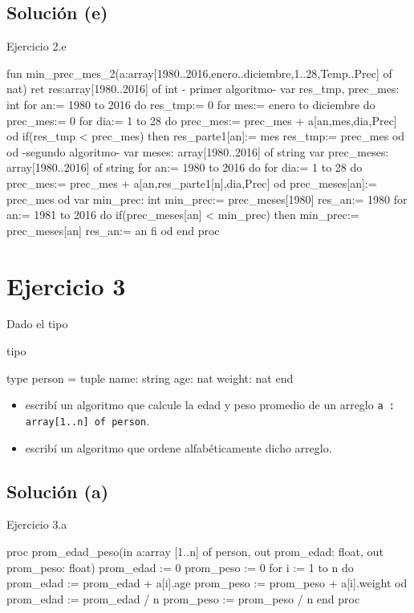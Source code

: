 \subsection{Solución (e)}
\begin{codebox}{Ejercicio 2.e}
\begin{pascallike}
fun min_prec_mes_2(a:array[1980..2016,enero..diciembre,1..28,Temp..Prec] of nat) 
    ret res:array[1980..2016] of int
{- primer algoritmo-}
var res_tmp, prec_mes: int
for an:= 1980 to 2016 do
    res_tmp:= 0
    for mes:= enero to diciembre do
        prec_mes:= 0
        for dia:= 1 to 28 do
        prec_mes:= prec_mes + a[an,mes,dia,Prec]
        od
        if(res_tmp < prec_mes) then
        res_parte1[an]:= mes
        res_tmp:= prec_mes
    od
od
{-segundo algoritmo-}
var meses: array[1980..2016] of string
var prec_meses: array[1980..2016] of string
for an:= 1980 to 2016 do
    for dia:= 1 to 28 do
        prec_mes:= prec_mes + a[an,res_parte1[n],dia,Prec]
    od
    prec_meses[an]:= prec_mes
od
var min_prec: int
min_prec:= prec_meses[1980]
res_an:= 1980
for an:= 1981 to 2016 do
    if(prec_meses[an] < min_prec) then
        min_prec:= prec_meses[an]
        res_an:= an
    fi
od
end proc
\end{pascallike}
\end{codebox}

\section{Ejercicio 3}
Dado el tipo

\begin{codebox}{tipo}
\begin{pascallike}
type person = tuple
     name: string
     age: nat
     weight: nat
    end
\end{pascallike}
\end{codebox}

\begin{itemize}
    \item[(a)] escribí un algoritmo que calcule la edad y peso promedio de un arreglo \texttt{a : array[1..n] of person}.
    \item[(b)] escribí un algoritmo que ordene alfabéticamente dicho arreglo. 
\end{itemize}

\subsection{Solución (a)}
\begin{codebox}{Ejercicio 3.a}
\begin{pascallike}
proc prom_edad_peso(in a:array [1..n] of person, out prom_edad: float, 
    out prom_peso: float)
prom_edad := 0
prom_peso := 0
for i := 1 to n do
    prom_edad := prom_edad + a[i].age
    prom_peso := prom_peso + a[i].weight
od
prom_edad := prom_edad / n
prom_peso := prom_peso / n
end proc
\end{pascallike}
\end{codebox}

